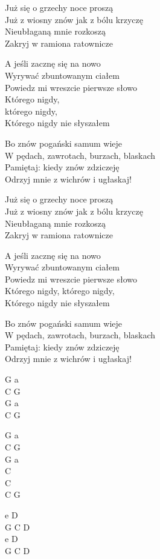 \begin{text}
    Już się o grzechy noce proszą\\
    Już z wiosny znów jak z bólu krzyczę\\
    Nieubłaganą mnie rozkoszą\\
    Zakryj w ramiona ratownicze

    A jeśli zacznę się na nowo\\
    Wyrywać zbuntowanym ciałem\\
    Powiedz mi wreszcie pierwsze słowo\\
    Którego nigdy,\\
    którego nigdy,\\
    Którego nigdy nie słyszałem

    Bo znów pogański samum wieje\\
    W pędach, zawrotach, burzach, blaskach\\
    Pamiętaj: kiedy znów zdziczeję\\
    Odrzyj mnie z wichrów i ugłaskaj!

    Już się o grzechy noce proszą\\
    Już z wiosny znów jak z bólu krzyczę\\
    Nieubłaganą mnie rozkoszą\\
    Zakryj w ramiona ratownicze

    A jeśli zacznę się na nowo\\
    Wyrywać zbuntowanym ciałem\\
    Powiedz mi wreszcie pierwsze słowo\\
    Którego nigdy, którego nigdy,\\
    Którego nigdy nie słyszałem

    Bo znów pogański samum wieje\\
    W pędach, zawrotach, burzach, blaskach\\
    Pamiętaj: kiedy znów zdziczeję\\
    Odrzyj mnie z wichrów i ugłaskaj!
\end{text}
\begin{chord}
    G a\\
    C G\\
    G a\\
    C G

    G a\\
    C G\\
    G a\\
    C\\
    C\\
    C G

    e D\\
    G C D\\
    e D\\
    G C D
\end{chord}